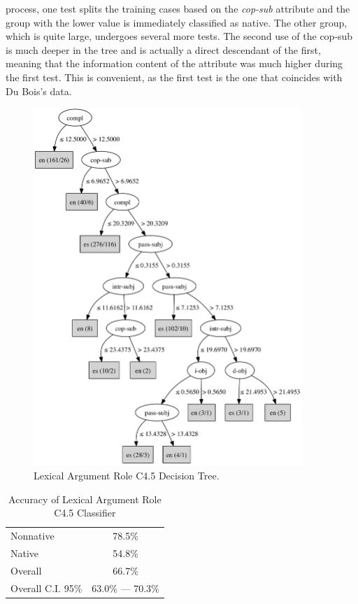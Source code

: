 \documentclass[main.tex]{subfiles}
\begin{document}
process, one test splits the training cases based on the \textit{cop-sub} attribute and the group with the lower value is immediately classified as native. The other group, which is quite large, undergoes several more tests. The second use of the cop-sub is much deeper in the tree and is actually a direct descendant of the first, meaning that the information content of the attribute was much higher during the first test. This is convenient, as the first test is the one that coincides with Du Bois's data. 

\begin{figure}[ht]
\centering
\includegraphics[width=4in]{c45-lex-role.pdf}
\caption{Lexical Argument Role C4.5 Decision Tree.}
\label{fig:c4.5-lex-role}
\end{figure}

\begin{table}[ht]
\centering
\caption{Accuracy of Lexical Argument Role C4.5 Classifier}
\begin{tabular}{l c}
\toprule
Nonnative & 78.5\% \\
Native & 54.8\%\\
Overall & 66.7\% \\
Overall C.I. 95\% & 63.0\% --- 70.3\%\\
\bottomrule
\end{tabular}
\label{table:lex-role-results}
\end{table}
\end{document}
